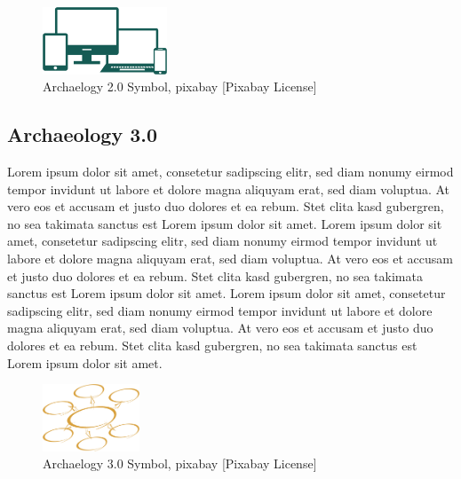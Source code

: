 \documentclass[twocolumn]{autart}
\begin{document}
\begin{figure}[!htb]
\begin{center}
\includegraphics[height=2cm]{a20.png}    %
\caption{Archaelogy 2.0 Symbol, pixabay [Pixabay License]}  %
\label{figa20symbol}                                 %
\end{center}                                 %
\end{figure}

\subsection{Archaeology 3.0}

Lorem ipsum dolor sit amet, consetetur sadipscing elitr, sed diam nonumy eirmod tempor invidunt ut labore et dolore magna aliquyam erat, sed diam voluptua. At vero eos et accusam et justo duo dolores et ea rebum. Stet clita kasd gubergren, no sea takimata sanctus est Lorem ipsum dolor sit amet. Lorem ipsum dolor sit amet, consetetur sadipscing elitr, sed diam nonumy eirmod tempor invidunt ut labore et dolore magna aliquyam erat, sed diam voluptua. At vero eos et accusam et justo duo dolores et ea rebum. Stet clita kasd gubergren, no sea takimata sanctus est Lorem ipsum dolor sit amet. Lorem ipsum dolor sit amet, consetetur sadipscing elitr, sed diam nonumy eirmod tempor invidunt ut labore et dolore magna aliquyam erat, sed diam voluptua. At vero eos et accusam et justo duo dolores et ea rebum. Stet clita kasd gubergren, no sea takimata sanctus est Lorem ipsum dolor sit amet. 

\cite{bernerslee_linkeddata}

\cite{hausenblas_5star}

\cite{isaksen_archaeology}

\cite{thiery_geinarfa}

\begin{figure}[!htb]
\begin{center}
\includegraphics[height=2cm]{a30.png}    %
\caption{Archaelogy 3.0 Symbol, pixabay [Pixabay License]}  %
\label{figa30symbol}                                 %
\end{center}                                 %
\end{figure}
\end{document}
